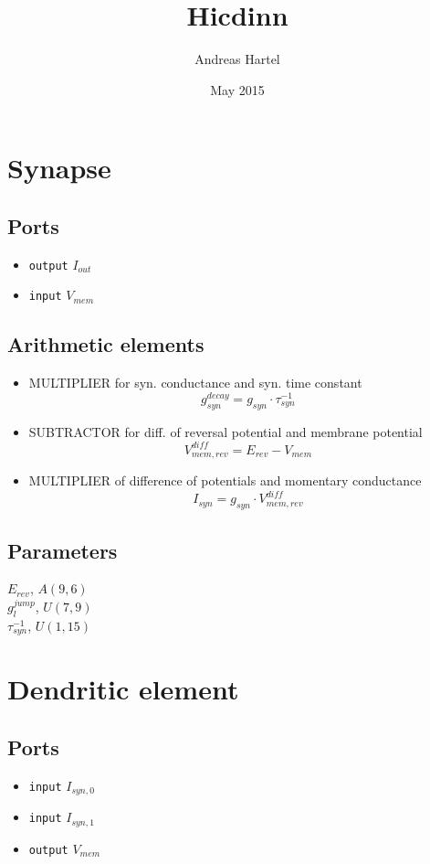 \documentclass[a4paper]{report}
\begin{document}
\title{Hicdinn}
\author{Andreas Hartel}
\date{May 2015}
\maketitle

\section{Synapse}
\subsection{Ports}
	\begin{itemize}
		\item \texttt{output} $I_{out}$
		\item \texttt{input} $V_{mem}$
	\end{itemize}
\subsection{Arithmetic elements}
\begin{itemize}
	\item MULTIPLIER for syn. conductance and syn. time constant
		\begin{equation}
			g_{syn}^{decay} = g_{syn} \cdot \tau_{syn}^{-1}
		\end{equation}
	\item SUBTRACTOR for diff. of reversal potential and membrane potential
		\begin{equation}
			V_{mem,rev}^{diff} = E_{rev} - V_{mem}
		\end{equation}
	\item MULTIPLIER of difference of potentials and momentary conductance
		\begin{equation}
			I_{syn} = g_{syn} \cdot V_{mem,rev}^{diff}
		\end{equation}
\end{itemize}
\subsection{Parameters}
$E_{rev}$, $A(9,6)$\\
$g_l^{jump}$, $U(7,9)$\\
$\tau_{syn}^{-1}$, $U(1,15)$\\
\section{Dendritic element}
\subsection{Ports}
	\begin{itemize}
		\item \texttt{input} $I_{syn,0}$
		\item \texttt{input} $I_{syn,1}$
		\item \texttt{output} $V_{mem}$
	\end{itemize}
\end{document}
